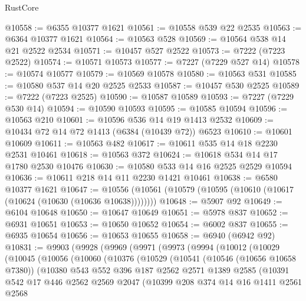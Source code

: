 \begin{lexlean}{RustCore}
\begin{coremodule}
@10558 := @6355 @10377 @1621
@10561 := @10558 @539 @22 @2535
@10563 := @6364 @10377 @1621
@10564 := @10563 @528
@10569 := @10564 @538 @14 @21 @2522 @2534
@10571 := @10457 @527 @2522
@10573 := @7222 (@7223 @2522)
@10574 := @10571 @10573
@10577 := @7227 (@7229 @527 @14)
@10578 := @10574 @10577
@10579 := @10569 @10578
@10580 := @10563 @531
@10585 := @10580 @537 @14 @20 @2525 @2533
@10587 := @10457 @530 @2525
@10589 := @7222 (@7223 @2525)
@10590 := @10587 @10589
@10593 := @7227 (@7229 @530 @14)
@10594 := @10590 @10593
@10595 := @10585 @10594
@10596 := @10563 @210
@10601 := @10596 @536 @14 @19 @1413 @2532
@10609 := @10434 @72 @14 @72 @1413 (@6384 (@10439 @72)) @6523
@10610 := @10601 @10609
@10611 := @10563 @482
@10617 := @10611 @535 @14 @18 @2230 @2531 @10461
@10618 := @10563 @372
@10624 := @10618 @534 @14 @17 @1780 @2530 @10476
@10630 := @10580 @533 @14 @16 @2525 @2529 @10594
@10636 := @10611 @218 @14 @11 @2230 @1421 @10461
@10638 := @6580 @10377 @1621
@10647 := @10556 (@10561 (@10579 (@10595 (@10610 (@10617 (@10624 (@10630 (@10636 @10638))))))))
@10648 := @5907 @92
@10649 := @6104 @10648
@10650 := @10647 @10649
@10651 := @5978 @837
@10652 := @6931 @10651
@10653 := @10650 @10652
@10654 := @6002 @837
@10655 := @6935 @10654
@10656 := @10653 @10655
@10658 := @6940 (@6942 @92)
@10831 := @9903
    (@9928
      (@9969
        (@9971
          (@9973
            (@9994
              (@10012
                (@10029
                  (@10045
                    (@10056
                      (@10060
                        (@10376
                          (@10529
                            (@10541
                              (@10546 (@10656 @10658 @7380))
                              (@10380
                                @543
                                @552
                                @396
                                @187
                                @2562
                                @2571
                                @1389
                                @2585
                                (@10391
                                  @542
                                  @17
                                  @446
                                  @2562
                                  @2569
                                  @2047
                                  (@10399
                                    @208
                                    @374
                                    @14
                                    @16
                                    @1411
                                    @2561
                                    @2568

\end{coremodule}
\end{lexlean}
